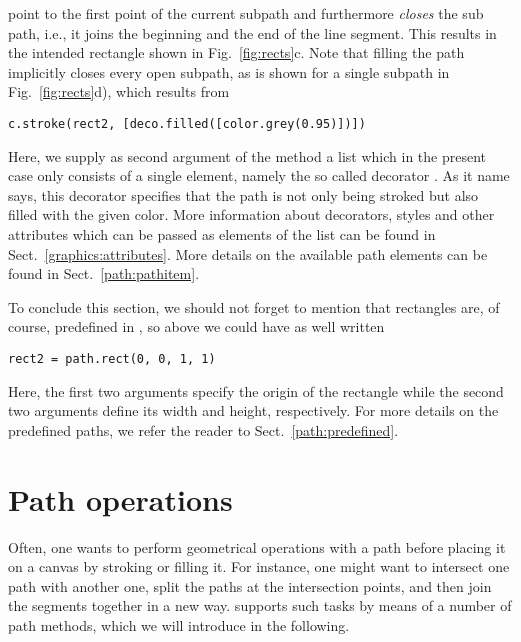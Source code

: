 point to the first point of the current subpath and furthermore
\textit{closes} the sub path, i.e., it joins the beginning and the end
of the line segment. This results in the intended rectangle shown in
Fig.~\ref{fig:rects}c. Note that filling the path implicitly closes
every open subpath, as is shown for a single subpath in
Fig.~\ref{fig:rects}d), which results from
\begin{verbatim}
c.stroke(rect2, [deco.filled([color.grey(0.95)])])
\end{verbatim}
Here, we supply as second argument of the  method a
list which in the present case only consists of a single element,
namely the so called decorator . As it name says,
this decorator specifies that the path is not only being stroked but
also filled with the given color. More information about decorators,
styles and other attributes which can be passed as elements of the
list can be found in Sect.~\ref{graphics:attributes}.  More details on
the available path elements can be found in Sect.~\ref{path:pathitem}.

To conclude this section, we should not forget to mention that
rectangles are, of course, predefined in \PyX{}, so above we could
have as well written
\begin{verbatim}
rect2 = path.rect(0, 0, 1, 1)
\end{verbatim}
Here, the first two arguments specify the origin of the rectangle
while the second two arguments define its width and height,
respectively. For more details on the predefined paths, we
refer the reader to Sect.~\ref{path:predefined}.

\section{Path operations}

Often, one wants to perform geometrical operations with a path before
placing it on a canvas by stroking or filling it.  For instance, one
might want to intersect one path with another one, split the paths at
the intersection points, and then join the segments together in a new
way. \PyX{} supports such tasks by means of a number of path methods,
which we will introduce in the following.

